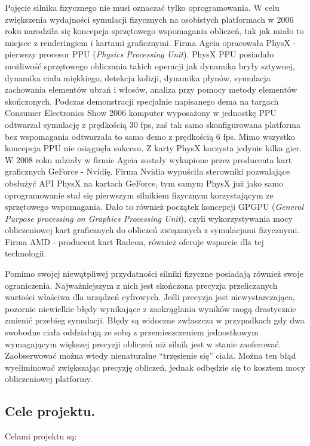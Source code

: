 Pojęcie silnika fizycznego nie musi oznaczać tylko oprogramowania. W celu
zwiększenia wydajności symulacji fizycznych na osobistych platformach w 2006
roku narodziła się koncepcja sprzętowego wspomagania obliczeń, tak jak miało to
miejsce z renderingiem i kartami graficznymi. Firma Ageia opracowała PhysX -
pierwszy procesor PPU (\emph{Physics Processing Unit}). PhysX PPU posiadało
możliwość sprzętowego obliczania takich operacji jak dynamika bryły sztywnej, dynamika
ciała miękkiego, detekcja kolizji, dynamika płynów, symulacja zachowania
elementów ubrań i włosów, analiza przy pomocy metody elementów skończonych.
Podczas demonstracji specjalnie napisanego dema na targach Consumer Electronics
Show 2006 komputer wyposażony w jednostkę PPU odtwarzał symulację z prędkością
30 fps, zaś tak samo skonfigurowana platforma bez wspomagania odtwarzała to samo
demo z prędkością 6 fps. Mimo wszystko koncepcja PPU nie osiągnęła sukcesu. Z
karty PhysX korzysta jedynie kilka gier. W 2008 roku udziały w firmie Ageia
zostały wykupione przez producenta kart graficznych GeForce - Nvidię. Firma
Nvidia wypuściła sterowniki pozwalające obsłużyć API PhysX na kartach GeForce,
tym samym PhysX już jako samo oprogramowanie stał się pierwszym silnikiem
fizycznym korzystającym ze sprzętowego wspomagania. Dało to również początek
koncepcji GPGPU (\emph{General Purpose processing on Graphics Processing Unit}),
czyli wykorzystywania mocy obliczeniowej kart graficznych do obliczeń związanych
z symulacjami fizycznymi. Firma AMD - producent kart Radeon, również oferuje
wsparcie dla tej technologii.

Pomimo swojej niewątpliwej przydatności silniki fizyczne posiadają również swoje
ograniczenia. Najważniejszym z nich jest skończona precyzja przeliczanych
wartości właściwa dla urządzeń cyfrowych. Jeśli precyzja jest niewystarczająca,
pozornie niewielkie błędy wynikające z zaokrąglania wyników mogą drastycznie
zmienić przebieg symulacji. Błędy są widoczne zwłaszcza w przypadkach gdy dwa
swobodne ciała oddziałują ze sobą z przemieszczeniem jednostkowym wymagającym
większej precyzji obliczeń niż silnik jest w stanie zaoferować. Zaobserwować
można wtedy nienaturalne ``trzęsienie się'' ciała. Można ten błąd wyeliminować
zwiększając precyzję obliczeń, jednak odbędzie się to kosztem mocy obliczeniowej
platformy.

\subsection{Cele projektu.}\label{subsec:celeProjektu}
Celami projektu są:\\

